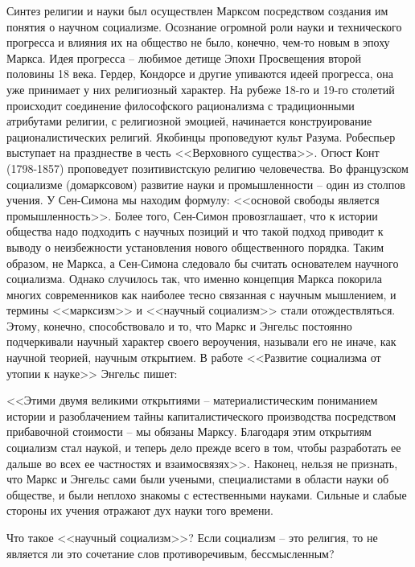 \documentclass{book}
\begin{document}
Синтез религии и науки был осуществлен Марксом посред­ством создания им понятия о научном социализме.  Осознание огромной роли науки и технического прогресса и влияния их на общество не было, конечно, чем-то новым в эпоху Маркса. Идея прогресса -- любимое детище Эпохи Просвещения второй половины 18 века. Гердер, Кондорсе и другие упиваются идеей прогресса, она уже принимает у них религиозный характер. На рубеже 18-го и 19-го столетий происходит соединение философского рационализма с традиционными атрибутами религии, с религиозной эмоцией, начинается конструирование рационалистических религий. Якобинцы проповедуют культ Разума. Робеспьер выступает на празднестве в честь <<Верховного существа>>. Огюст Конт (1798-1857) проповедует позитивистскую религию человечества. Во французском социализме (домарксовом) развитие науки и промышленности -- один из столпов учения. У Сен-Симона мы находим формулу: <<основой свободы является промышленность>>. Более того, Сен-Симон провозглашает, что к истории общества надо подходить 
с научных позиций и что такой подход приводит к выводу о неизбежности установления нового общественного порядка. Таким образом, не Маркса, а Сен-Симона следовало бы считать основателем научного социализма. Однако случилось так, что именно концепция Маркса покорила многих современников как наиболее тесно связанная с научным мышлением, и термины <<марксизм>> и <<научный социализм>> стали отождествляться. Этому, конечно, способствовало и то, что Маркс и Энгельс постоянно подчеркивали научный характер своего вероучения, называли его не иначе, как научной теорией, научным открытием. В работе <<Развитие социализма от утопии к науке>> Энгельс пишет:

<<Этими двумя великими открытиями -- материалистическим пониманием истории и разоблачением тайны капиталистиче­ского производства посредством прибавочной стоимости -- мы обязаны Марксу. Благодаря этим открытиям социализм стал наукой,  и теперь дело прежде всего в том, чтобы разработать ее дальше во всех ее частностях и взаимосвязях>>. Наконец, нельзя не признать, что Маркс и Энгельс сами были учеными, специалистами в области науки об обществе, и были неплохо знакомы с естественными науками. Сильные и слабые стороны их учения отражают дух науки того времени.

Что такое <<научный социализм>>? Если социализм -- это ре­лигия, то не является ли это сочетание слов противоречивым, бессмысленным?
\end{document}
